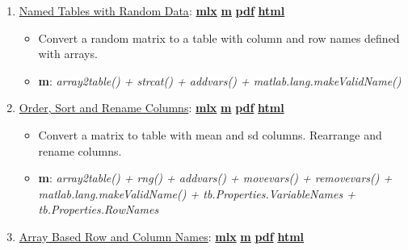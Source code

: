 \documentclass[
]{book}
\providecommand{\tightlist}{%
  \setlength{\itemsep}{0pt}\setlength{\parskip}{0pt}}
\begin{document}
\begin{enumerate}
\def\labelenumi{\arabic{enumi}.}
\tightlist
\item
  \href{https://fanwangecon.github.io/M4Econ/table/main/htmlpdfm/fs_tab_gensample.html}{Named Tables with Random Data}: \href{https://github.com/FanWangEcon/M4Econ/blob/master/table/main/fs_tab_gensample.mlx}{\textbf{mlx}} \textbar{} \href{https://github.com/FanWangEcon/M4Econ/blob/master/table/main/htmlpdfm/fs_tab_gensample.m}{\textbf{m}} \textbar{} \href{https://github.com/FanWangEcon/M4Econ/blob/master/table/main/htmlpdfm/fs_tab_gensample.pdf}{\textbf{pdf}} \textbar{} \href{https://fanwangecon.github.io/M4Econ/table/main/htmlpdfm/fs_tab_gensample.html}{\textbf{html}}

  \begin{itemize}
  \tightlist
  \item
    Convert a random matrix to a table with column and row names defined with arrays.
  \item
    \textbf{m}: \emph{array2table() + strcat() + addvars() + matlab.lang.makeValidName()}
  \end{itemize}
\item
  \href{https://fanwangecon.github.io/M4Econ/table/main/htmlpdfm/fs_tab_ordersort.html}{Order, Sort and Rename Columns}: \href{https://github.com/FanWangEcon/M4Econ/blob/master/table/main/fs_tab_ordersort.mlx}{\textbf{mlx}} \textbar{} \href{https://github.com/FanWangEcon/M4Econ/blob/master/table/main/htmlpdfm/fs_tab_ordersort.m}{\textbf{m}} \textbar{} \href{https://github.com/FanWangEcon/M4Econ/blob/master/table/main/htmlpdfm/fs_tab_ordersort.pdf}{\textbf{pdf}} \textbar{} \href{https://fanwangecon.github.io/M4Econ/table/main/htmlpdfm/fs_tab_ordersort.html}{\textbf{html}}

  \begin{itemize}
  \tightlist
  \item
    Convert a matrix to table with mean and sd columns. Rearrange and rename columns.
  \item
    \textbf{m}: \emph{array2table() + rng() + addvars() + movevars() + removevars() + matlab.lang.makeValidName() + tb.Properties.VariableNames + tb.Properties.RowNames}
  \end{itemize}
\item
  \href{https://fanwangecon.github.io/M4Econ/table/main/htmlpdfm/fs_tab_rowcolstrs.html}{Array Based Row and Column Names}: \href{https://github.com/FanWangEcon/M4Econ/blob/master/table/main/fs_tab_rowcolstrs.mlx}{\textbf{mlx}} \textbar{} \href{https://github.com/FanWangEcon/M4Econ/blob/master/table/main/htmlpdfm/fs_tab_rowcolstrs.m}{\textbf{m}} \textbar{} \href{https://github.com/FanWangEcon/M4Econ/blob/master/table/main/htmlpdfm/fs_tab_rowcolstrs.pdf}{\textbf{pdf}} \textbar{} \href{https://fanwangecon.github.io/M4Econ/table/main/htmlpdfm/fs_tab_rowcolstrs.html}{\textbf{html}}


\end{enumerate}
\end{document}
